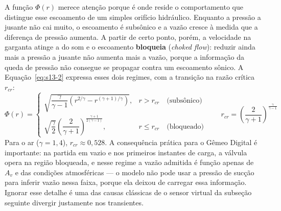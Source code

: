 \documentclass[12pt,a4paper]{article}
\numberwithin{equation}{section}
\numberwithin{table}{section}
\numberwithin{figure}{section}
\begin{document}
{	A função $\Phi(r)$ merece atenção porque é onde reside o comportamento que distingue esse escoamento de um simples orifício hidráulico. Enquanto a pressão a jusante não cai muito, o escoamento é subsônico e a vazão cresce à medida que a diferença de pressão aumenta. A partir de certo ponto, porém, a velocidade na garganta atinge a do som e o escoamento \textbf{bloqueia} (\textit{choked flow}): reduzir ainda mais a pressão a jusante não aumenta mais a vazão, porque a informação da queda de pressão não consegue se propagar contra um escoamento sônico. A Equação~\eqref{eq:s13-2} expressa esses dois regimes, com a transição na razão crítica $r_{cr}$:
	\begin{equation}\label{eq:s13-2}
	\Phi(r) = \begin{cases}
	\sqrt{\dfrac{\gamma}{\gamma - 1}\left(r^{2/\gamma} - r^{(\gamma+1)/\gamma}\right)}, & r > r_{cr} \quad \text{(subsônico)} \\[1.4em]
	\sqrt{\dfrac{\gamma}{2}}\left(\dfrac{2}{\gamma+1}\right)^{\frac{\gamma+1}{2(\gamma-1)}}, & r \leq r_{cr} \quad \text{(bloqueado)}
	\end{cases}
	\qquad r_{cr} = \left(\frac{2}{\gamma+1}\right)^{\frac{\gamma}{\gamma-1}}
	\end{equation}
	Para o ar ($\gamma = 1{,}4$), $r_{cr} \approx 0{,}528$. A consequência prática para o Gêmeo Digital é importante: na partida em vazio e nos primeiros instantes de carga, a válvula opera na região bloqueada, e nesse regime a vazão admitida é função apenas de $A_v$ e das condições atmosféricas — o modelo não pode usar a pressão de sucção para inferir vazão nessa faixa, porque ela deixou de carregar essa informação. Ignorar esse detalhe é uma das causas clássicas de o sensor virtual da subseção seguinte divergir justamente nos transientes.

}
\end{document}
